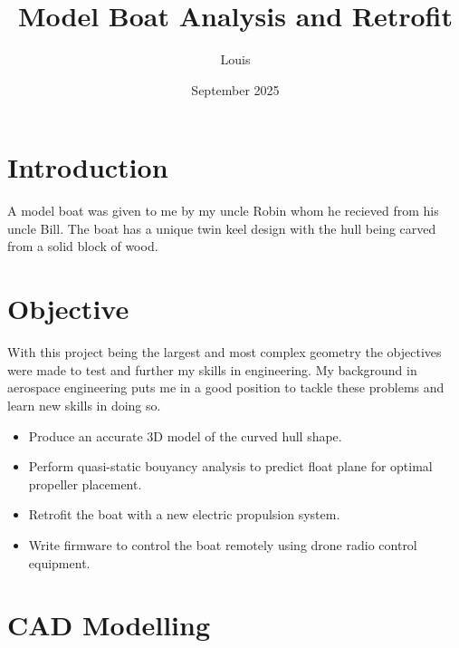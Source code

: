 \documentclass{article}
\begin{document}
\title{Model Boat Analysis and Retrofit}
\author{Louis}
\date{September 2025}
\maketitle 

\section{Introduction}



A model boat was given to me by my uncle Robin whom he recieved from his uncle Bill.
The boat has a unique twin keel design with the hull being carved from a solid block of wood.

\section{Objective}

With this project being the largest and most complex geometry the objectives were made to test and further my skills in engineering.
My background in aerospace engineering puts me in a good position to tackle these problems and learn new skills in doing so.

\begin{itemize}
    \item Produce an accurate 3D model of the curved hull shape.
    \item Perform quasi-static bouyancy analysis to predict float plane for optimal propeller placement.
    \item Retrofit the boat with a new electric propulsion system.
    \item Write firmware to control the boat remotely using drone radio control equipment.
\end{itemize}

\section{CAD Modelling}
\end{document}
